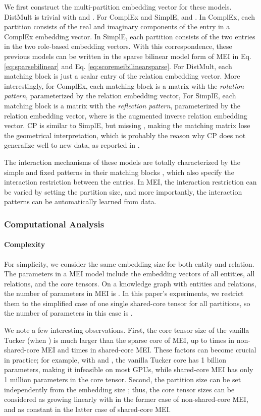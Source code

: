 \documentclass{ecai}
\theoremstyle{plain}  \newtheorem{thm}{Theorem}  \newtheorem{lem}[thm]{Lemma}  \newtheorem{prop}[thm]{Proposition}
\theoremstyle{remark}  \newtheorem*{rem}{Remark}
\begin{document}
We first construct the multi-partition embedding vector for these models. DistMult is trivial with  and . For ComplEx and SimplE,  and . In ComplEx, each partition  consists of the real and imaginary components of the entry  in a ComplEx embedding vector. In SimplE, each partition  consists of the two entries  in the two role-based embedding vectors. With this correspondence, these previous models can be written in the sparse bilinear model form of MEI in Eq. \ref{eq:sparsebilinear} and Eq. \ref{eq:scoremeibilinearsparse}. For DistMult, each matching block  is just a scalar entry of the relation embedding vector. More interestingly, for ComplEx, each matching block is a  matrix with the \textit{rotation pattern}, parameterized by the relation embedding vector,  For SimplE, each matching block is a  matrix with the \textit{reflection pattern}, parameterized by the relation embedding vector,  where  is the augmented inverse relation embedding vector. CP \cite{hitchcock_expressiontensorpolyadic_1927} is similar to SimplE, but missing , making the matching matrix lose the geometrical interpretation, which is probably the reason why CP does not generalize well to new data, as reported in \cite{tran_analyzingknowledgegraph_2019}. 

The interaction mechanisms of these models are totally characterized by the simple and fixed patterns in their matching blocks , which also specify the interaction restriction between the entries. In MEI, the interaction restriction can be varied by setting the partition size, and more importantly, the interaction patterns can be automatically learned from data.

\subsubsection{Computational Analysis} \paragraph{Complexity} For simplicity, we consider the same embedding size  for both entity and relation. The parameters in a MEI model include the embedding vectors of all entities, all relations, and the core tensors. On a knowledge graph with  entities and  relations, the number of parameters in MEI is . In this paper's experiments, we restrict them to the simplified case of one single shared-core tensor for all  partitions, so the number of parameters in this case is .

We note a few interesting observations. First, the core tensor size of the vanilla Tucker (when ) is much larger than the sparse core of MEI, up to  times in non-shared-core MEI and  times in shared-core MEI. These factors can become crucial in practice; for example, with  and , the vanilla Tucker core has 1 billion parameters, making it infeasible on most GPUs, while shared-core MEI has only 1 million parameters in the core tensor. Second, the partition size  can be set independently from the embedding size ; thus, the core tensor sizes can be considered as growing linearly with  in the former case of non-shared-core MEI, and as constant in the latter case of shared-core MEI.
\end{document}
